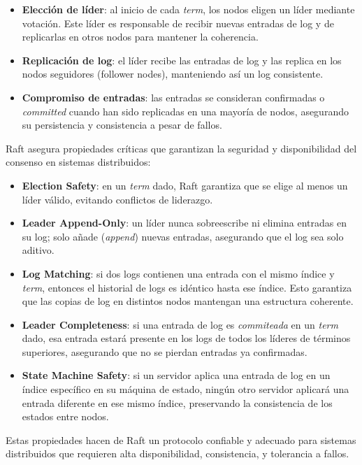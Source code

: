 \documentclass[12pt]{article}
\begin{document}
\begin{itemize}
    \item \textbf{Elección de líder}: al inicio de cada \textit{term}, los nodos eligen un líder mediante votación. Este líder es responsable de recibir nuevas entradas de log y de replicarlas en otros nodos para mantener la coherencia.
    \item \textbf{Replicación de log}: el líder recibe las entradas de log y las replica en los nodos seguidores (follower nodes), manteniendo así un log consistente.
    \item \textbf{Compromiso de entradas}: las entradas se consideran confirmadas o \textit{committed} cuando han sido replicadas en una mayoría de nodos, asegurando su persistencia y consistencia a pesar de fallos.
\end{itemize}

Raft asegura propiedades críticas que garantizan la seguridad y disponibilidad del consenso en sistemas distribuidos:

\begin{itemize}
    \item \textbf{Election Safety}: en un \textit{term} dado, Raft garantiza que se elige al menos un líder válido, evitando conflictos de liderazgo.
    \item \textbf{Leader Append-Only}: un líder nunca sobreescribe ni elimina entradas en su log; solo añade (\textit{append}) nuevas entradas, asegurando que el log sea solo aditivo.
    \item \textbf{Log Matching}: si dos logs contienen una entrada con el mismo índice y \textit{term}, entonces el historial de logs es idéntico hasta ese índice. Esto garantiza que las copias de log en distintos nodos mantengan una estructura coherente.
    \item \textbf{Leader Completeness}: si una entrada de log es \textit{commiteada} en un \textit{term} dado, esa entrada estará presente en los logs de todos los líderes de términos superiores, asegurando que no se pierdan entradas ya confirmadas.
    \item \textbf{State Machine Safety}: si un servidor aplica una entrada de log en un índice específico en su máquina de estado, ningún otro servidor aplicará una entrada diferente en ese mismo índice, preservando la consistencia de los estados entre nodos.
\end{itemize}

Estas propiedades hacen de Raft un protocolo confiable y adecuado para sistemas distribuidos que requieren alta disponibilidad, consistencia, y tolerancia a fallos.
\end{document}
